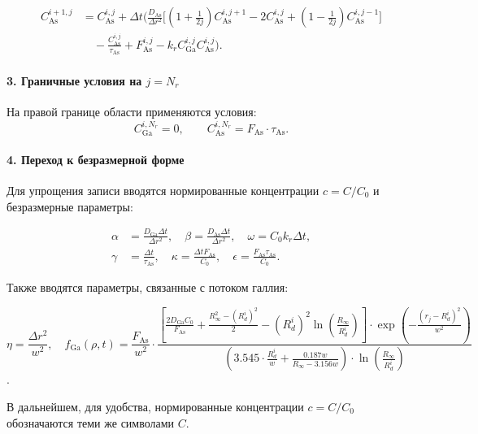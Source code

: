 \documentclass[14pt,oneside]{extarticle}
\begin{document}
\begin{align*}
    C_{\text{As}}^{i+1,j} &= C_{\text{As}}^{i,j}
    + \Delta t \Bigg(
      \frac{D_{\text{As}}}{\Delta r^2}
      \bigg[
        \left(1 + \frac{1}{2j} \right) C_{\text{As}}^{i,j+1}
        - 2 C_{\text{As}}^{i,j}
        + \left(1 - \frac{1}{2j} \right) C_{\text{As}}^{i,j-1}
      \bigg] \\
    &\quad - \frac{C_{\text{As}}^{i,j}}{\tau_{\text{As}}}
    + F_{\text{As}}^{i,j}
    - k_r C_{\text{Ga}}^{i,j} C_{\text{As}}^{i,j}
    \Bigg).
\end{align*}
    

\paragraph{3. Граничные условия на \( j = N_r \)}

На правой границе области применяются условия:
\[
C_{\text{Ga}}^{i,N_r} = 0, \qquad C_{\text{As}}^{i,N_r} = F_{\text{As}} \cdot \tau_{\text{As}}.
\]

\paragraph{4. Переход к безразмерной форме}

Для упрощения записи вводятся нормированные концентрации \( c = C / C_0 \) и безразмерные параметры:

\begin{align}
    \alpha &= \frac{D_{\text{Ga}} \Delta t}{\Delta r^2}, \quad
    \beta = \frac{D_{\text{As}} \Delta t}{\Delta r^2}, \quad
    \omega = C_0 k_r \Delta t, \nonumber \\
    \gamma &= \frac{\Delta t}{\tau_{\text{As}}}, \quad
    \kappa = \frac{\Delta t F_{\text{As}}}{C_0}, \quad
    \epsilon = \frac{F_{\text{As}} \tau_{\text{As}}}{C_0}.
\end{align}   

Также вводятся параметры, связанные с потоком галлия:

\[
\eta = \frac{\Delta r^2}{w^2}, \quad
f_{\mathrm{Ga}}(\rho, t) = 
\frac{F_{\mathrm{As}}}{w^2} \cdot 
\frac{
\left[
\frac{2 D_{\mathrm{Ga}} C_0}{F_{\mathrm{As}}}
+ \frac{R_\infty^2 - (R_d^i)^2}{2}
- (R_d^i)^2 \ln\left( \frac{R_\infty}{R_d^i} \right)
\right]
\cdot
\exp\left( - \frac{(r_j - R_d^i)^2}{w^2} \right)
}{
\left( 3.545 \cdot \frac{R_d^i}{w} + \frac{0.187 w}{R_\infty - 3.156 w} \right)
\cdot
\ln\left( \frac{R_\infty}{R_d^i} \right)
}
\]
.

В дальнейшем, для удобства, нормированные концентрации \( c = C / C_0 \)
обозначаются теми же символами \( C \).
\end{document}
